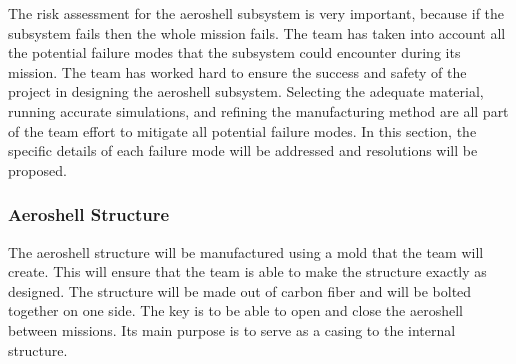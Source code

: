 The risk assessment for the aeroshell subsystem is very important, because if the subsystem fails then the whole mission fails. The team has taken into account all the potential failure modes that the subsystem could encounter during its mission. The team has worked hard to ensure the success and safety of the project in designing the aeroshell subsystem. Selecting the adequate material, running accurate simulations, and refining the manufacturing method are all part of the team effort to mitigate all potential failure modes. In this section, the specific details of each failure mode will be addressed and resolutions will be proposed. 


\subsubsection{Aeroshell Structure}
\indent\indent The aeroshell structure will be manufactured using a mold that the team will create. This will ensure that the team is able to make the structure exactly as designed. The structure will be made out of carbon fiber and will be bolted together on one side. The key is to be able to open and close the aeroshell between missions. Its main purpose is to serve as a casing to the internal structure.  
\begin{table}[H]
\caption{\label{tab:aeroshell_strucure} Aeroshell Structure Failure Modes \& Probabilities}
\centering

\end{table}
